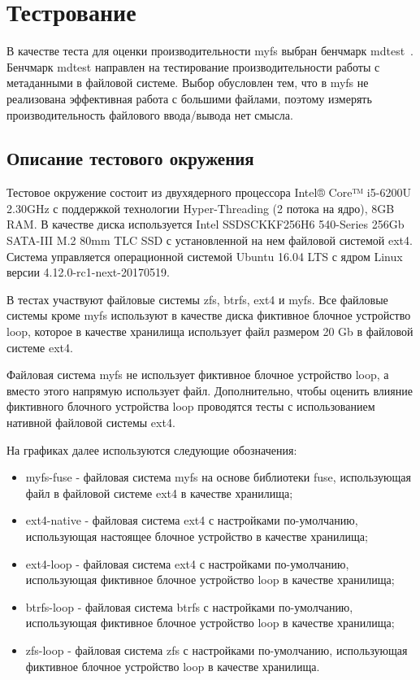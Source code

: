 \section{Тестрование}

В качестве теста для оценки производительности myfs выбран бенчмарк
mdtest~\cite{MDTEST}. Бенчмарк mdtest направлен на тестирование
производительности работы с метаданными в файловой системе. Выбор обусловлен
тем, что в myfs не реализована эффективная работа с большими файлами, поэтому
измерять производительность файлового ввода/вывода нет смысла.


\subsection{Описание тестового окружения}

Тестовое окружение состоит из двухядерного процессора Intel® Core™ i5-6200U
2.30GHz с поддержкой технологии Hyper-Threading (2 потока на ядро), 8GB RAM.
В качестве диска используется Intel SSDSCKKF256H6 540-Series 256Gb SATA-III M.2 
80mm TLC SSD с установленной на нем файловой системой ext4. Система управляется
операционной системой Ubuntu 16.04 LTS с ядром Linux версии
4.12.0-rc1-next-20170519.

В тестах участвуют файловые системы zfs, btrfs, ext4 и myfs. Все файловые
системы кроме myfs используют в качестве диска фиктивное блочное устройство
loop, которое в качестве хранилища использует файл размером 20 Gb в файловой
системе ext4.

Файловая система myfs не использует фиктивное блочное устройство loop, а вместо
этого напрямую использует файл. Дополнительно, чтобы оценить влияние фиктивного
блочного устройства loop проводятся тесты с использованием нативной файловой
системы ext4.

На графиках далее используются следующие обозначения:
\begin{itemize}
  \item myfs-fuse - файловая система myfs на основе библиотеки fuse,
        использующая файл в файловой системе ext4 в качестве хранилища;
  \item ext4-native - файловая система ext4 с настройками по-умолчанию,
        использующая настоящее блочное устройство в качестве хранилища;
  \item ext4-loop - файловая система ext4 с настройками по-умолчанию,
        использующая фиктивное блочное устройство loop в качестве хранилища;
  \item btrfs-loop - файловая система btrfs с настройками по-умолчанию,
        использующая фиктивное блочное устройство loop в качестве хранилища;
  \item zfs-loop - файловая система zfs с настройками по-умолчанию, использующая
        фиктивное блочное устройство loop в качестве хранилища.
\end{itemize}


